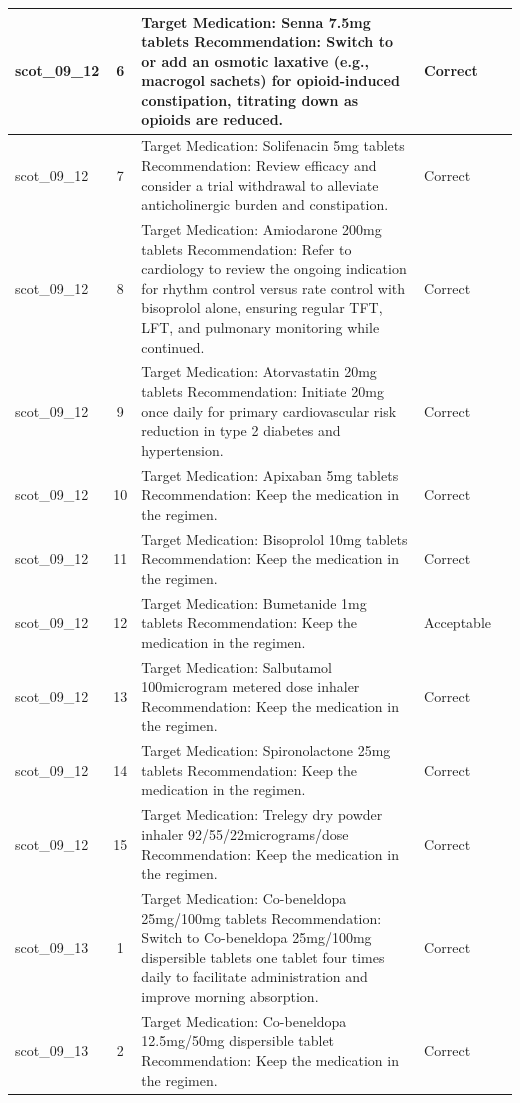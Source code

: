 \begin{longtable}{|p{1.45cm}|c|p{10.2cm}|p{1.55cm}|p{2.3cm}|}
\hline
scot\_09\_12 & 6 & Target Medication: Senna 7.5mg tablets Recommendation: Switch to or add an osmotic laxative (e.g., macrogol sachets) for opioid-induced constipation, titrating down as opioids are reduced. & Correct &  \\
\hline
scot\_09\_12 & 7 & Target Medication: Solifenacin 5mg tablets Recommendation: Review efficacy and consider a trial withdrawal to alleviate anticholinergic burden and constipation. & Correct &  \\
\hline
scot\_09\_12 & 8 & Target Medication: Amiodarone 200mg tablets Recommendation: Refer to cardiology to review the ongoing indication for rhythm control versus rate control with bisoprolol alone, ensuring regular TFT, LFT, and pulmonary monitoring while continued. & Correct &  \\
\hline
scot\_09\_12 & 9 & Target Medication: Atorvastatin 20mg tablets Recommendation: Initiate 20mg once daily for primary cardiovascular risk reduction in type 2 diabetes and hypertension. & Correct &  \\
\hline
scot\_09\_12 & 10 & Target Medication: Apixaban 5mg tablets Recommendation: Keep the medication in the regimen. & Correct &  \\
\hline
scot\_09\_12 & 11 & Target Medication: Bisoprolol 10mg tablets Recommendation: Keep the medication in the regimen. & Correct &  \\
\hline
scot\_09\_12 & 12 & Target Medication: Bumetanide 1mg tablets Recommendation: Keep the medication in the regimen. & Acceptable &  \\
\hline
scot\_09\_12 & 13 & Target Medication: Salbutamol 100microgram metered dose inhaler Recommendation: Keep the medication in the regimen. & Correct &  \\
\hline
scot\_09\_12 & 14 & Target Medication: Spironolactone 25mg tablets Recommendation: Keep the medication in the regimen. & Correct &  \\
\hline
scot\_09\_12 & 15 & Target Medication: Trelegy dry powder inhaler 92/55/22micrograms/dose Recommendation: Keep the medication in the regimen. & Correct &  \\
\hline
scot\_09\_13 & 1 & Target Medication: Co-beneldopa 25mg/100mg tablets Recommendation: Switch to Co-beneldopa 25mg/100mg dispersible tablets one tablet four times daily to facilitate administration and improve morning absorption. & Correct &  \\
\hline
scot\_09\_13 & 2 & Target Medication: Co-beneldopa 12.5mg/50mg dispersible tablet Recommendation: Keep the medication in the regimen. & Correct &  \\

\end{longtable}
